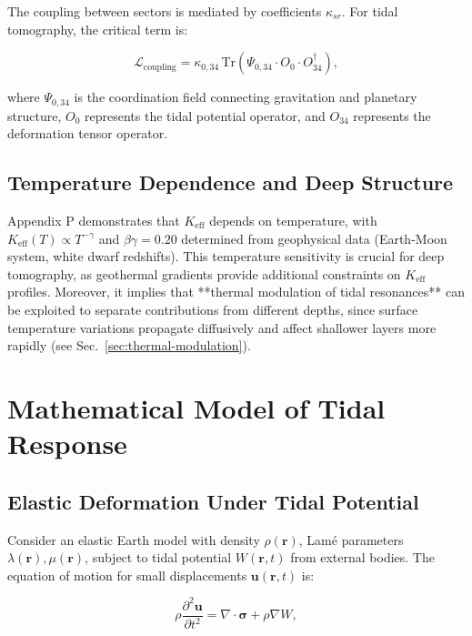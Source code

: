 \documentclass[12pt,a4paper]{article}
\theoremstyle{remark}
\newcommand{\Keff}{K_{\mathrm{eff}}}
\begin{document}
	The coupling between sectors is mediated by coefficients $\kappa_{sr}$. For tidal tomography, the critical term is:
	
	\begin{equation}
		\mathcal{L}_{\text{coupling}} = \kappa_{0,34} \, \mathrm{Tr}\left(\Psi_{0,34} \cdot O_0 \cdot O_{34}^\dagger\right),
		\label{eq:coupling}
	\end{equation}
	
	where $\Psi_{0,34}$ is the coordination field connecting gravitation and planetary structure, $O_0$ represents the tidal potential operator, and $O_{34}$ represents the deformation tensor operator.
	
	\subsection{Temperature Dependence and Deep Structure}
	
	Appendix P demonstrates that $\Keff$ depends on temperature, with $\Keff(T) \propto T^{-\gamma}$ and $\beta\gamma = 0.20$ determined from geophysical data (Earth-Moon system, white dwarf redshifts). This temperature sensitivity is crucial for deep tomography, as geothermal gradients provide additional constraints on $K_{\mathrm{eff}}$ profiles. Moreover, it implies that **thermal modulation of tidal resonances** can be exploited to separate contributions from different depths, since surface temperature variations propagate diffusively and affect shallower layers more rapidly (see Sec.~\ref{sec:thermal-modulation}).
	
	\section{Mathematical Model of Tidal Response}
	\label{sec:model}
	
	\subsection{Elastic Deformation Under Tidal Potential}
	
	Consider an elastic Earth model with density $\rho(\mathbf{r})$, Lamé parameters $\lambda(\mathbf{r}), \mu(\mathbf{r})$, subject to tidal potential $W(\mathbf{r},t)$ from external bodies. The equation of motion for small displacements $\mathbf{u}(\mathbf{r},t)$ is:
	
	\begin{equation}
		\rho \frac{\partial^2 \mathbf{u}}{\partial t^2} = \nabla \cdot \boldsymbol{\sigma} + \rho \nabla W,
		\label{eq:motion}
	\end{equation}
	
\end{document}
